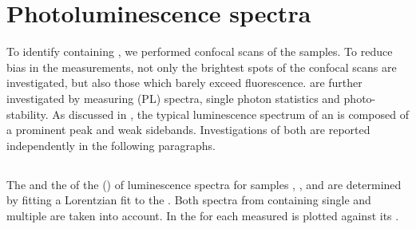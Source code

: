 
\section{Photoluminescence spectra} \label{sec::spectra}

	To identify \nds containing \sivs, we performed confocal scans of the samples.
	To reduce bias in the measurements, not only the brightest spots of the confocal scans are investigated, but also those which barely exceed \bkg fluorescence.
	\sivs are further investigated by measuring \pl (PL) spectra, single photon statistics and photo-stability.
	As discussed in , the typical luminescence spectrum of an \siv is composed of a prominent \zpl peak and weak sidebands.
	Investigations of both are reported independently in the following paragraphs.

\subsection{\Zpl}\label{subsec::zpl}

	The \cwl and the \lw of the \zpl (\ZPL) of \siv luminescence spectra for samples \insituF, \insituS, and \insituH are determined by fitting a Lorentzian fit to the \ZPL.
	Both spectra from \nds containing single and multiple \sivs are taken into account.
	In  the \lw for each measured \ZPL is plotted against its \cwl.

